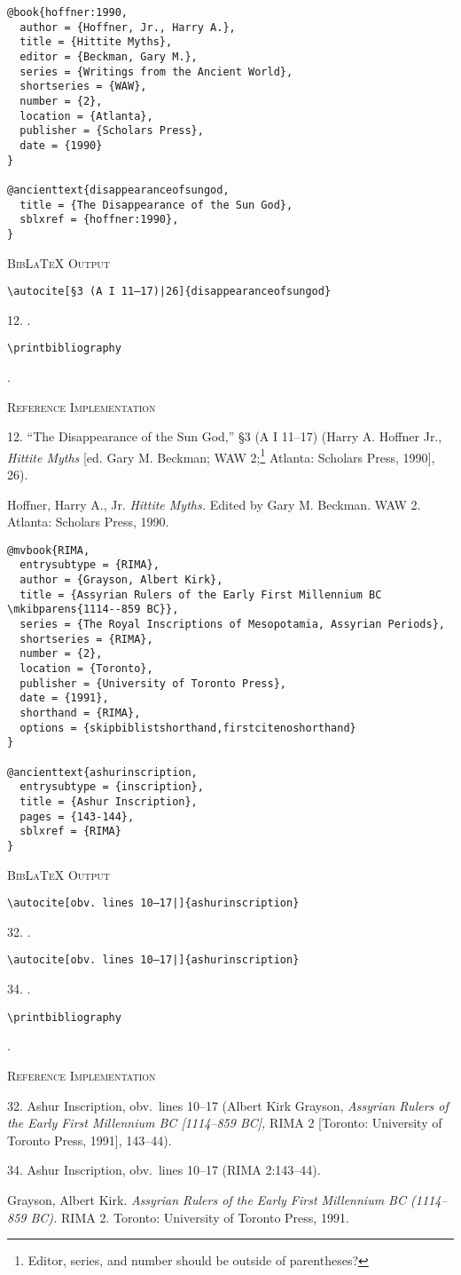 \documentclass[a4paper]{article}
\newcommand\citetestbib[6]{%
  {\textsc{BibLaTeX Output}\par
   \nobreak
   \texttt{\textbackslash autocite[#2]\{#5\}}\par
   \color{biblatex-colour}
   #1. \cite[#2]{#5}.\par
   \color{black}
   \texttt{\textbackslash autocite[#4]\{#5\}}\par
   \color{biblatex-colour}
   #3. \cite[#4]{#5}.\par
   \color{black}
   \texttt{\textbackslash printbibliography}\par
   \color{biblatex-colour}
   \hangindent\bibindent\bibentrycite{#6}.\par}}
\newcommand\citetestnsbib[4]{%
  {\textsc{BibLaTeX Output}\par
   \nobreak
   \texttt{\textbackslash autocite[#2]\{#3\}}\par
   \color{biblatex-colour}
   #1. \cite[#2]{#3}.\par
   \color{black}
   \texttt{\textbackslash printbibliography}\par
   \color{biblatex-colour}
   \hangindent\bibindent\bibentrycite{#4}.\par}}
\newenvironment{refimp}{%
  \begin{minipage}{\linewidth}
    \setlength{\parskip}{1ex}
    \textsc{Reference Implementation}\par
    \nobreak
    \color{reference-colour}
}{\end{minipage}}
\begin{document}
\begin{lstlisting}
@book{hoffner:1990,
  author = {Hoffner, Jr., Harry A.},
  title = {Hittite Myths},
  editor = {Beckman, Gary M.},
  series = {Writings from the Ancient World},
  shortseries = {WAW},
  number = {2},
  location = {Atlanta},
  publisher = {Scholars Press},
  date = {1990}
}

@ancienttext{disappearanceofsungod,
  title = {The Disappearance of the Sun God},
  sblxref = {hoffner:1990},
}
\end{lstlisting}

\citetestnsbib{12}{§3 (A I 11--17)|26}{disappearanceofsungod}{hoffner:1990}

\begin{refimp}
  12. “The Disappearance of the Sun God,” §3 (A I 11–17) (Harry A. Hoffner
  Jr., \emph{Hittite Myths} [ed. Gary M. Beckman; WAW 2;\footnote{Editor,
  series, and number should be outside of parentheses?} Atlanta: Scholars
  Press, 1990], 26).
  
  \hangindent\bibindent Hoffner, Harry A., Jr. \emph{Hittite Myths.} Edited by
  Gary M. Beckman. WAW 2. Atlanta: Scholars Press, 1990.
\end{refimp}

\begin{lstlisting}
@mvbook{RIMA,
  entrysubtype = {RIMA},
  author = {Grayson, Albert Kirk},
  title = {Assyrian Rulers of the Early First Millennium BC \mkibparens{1114--859 BC}},
  series = {The Royal Inscriptions of Mesopotamia, Assyrian Periods},
  shortseries = {RIMA},
  number = {2},
  location = {Toronto},
  publisher = {University of Toronto Press},
  date = {1991},
  shorthand = {RIMA},
  options = {skipbiblistshorthand,firstcitenoshorthand}
}

@ancienttext{ashurinscription,
  entrysubtype = {inscription},
  title = {Ashur Inscription},
  pages = {143-144},
  sblxref = {RIMA}
}
\end{lstlisting}

\citetestbib{32}{obv.\ lines 10–17|}{34}{obv.\ lines 10–17|}{ashurinscription}{RIMA}

\begin{refimp}
  32. Ashur Inscription, obv.\ lines 10–17 (Albert Kirk Grayson,
  \emph{Assyrian Rulers of the Early First Millennium BC [1114–859 BC],} RIMA
  2 [Toronto: University of Toronto Press, 1991], 143–44).

  34. Ashur Inscription, obv.\ lines 10–17 (RIMA 2:143–44).

  \hangindent\bibindent Grayson, Albert Kirk. \emph{Assyrian Rulers of the
  Early First Millennium BC (1114–859 BC).} RIMA 2. Toronto: University of
  Toronto Press, 1991.
\end{refimp}
\end{document}

